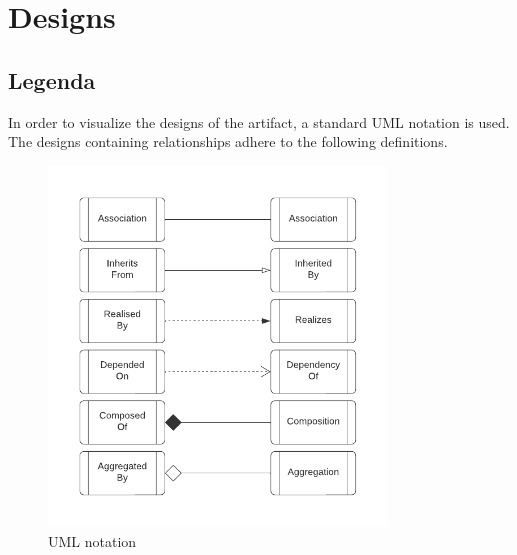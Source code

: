 \chapter{Designs} \label{appendix_designs} 

\section{Legenda} \label{appendix_legenda} 

In order to visualize the designs of the artifact, a standard UML notation is used. The
designs containing relationships adhere to the following definitions.

\begin{figure}[H]
  \centering
  \includegraphics[width=0.8\textwidth]{figures/class_diagram_legenda.pdf}
  \caption[UML Notation used]{UML notation}
  \label{fi:class_diagram_relationship_notation}
\end{figure}

